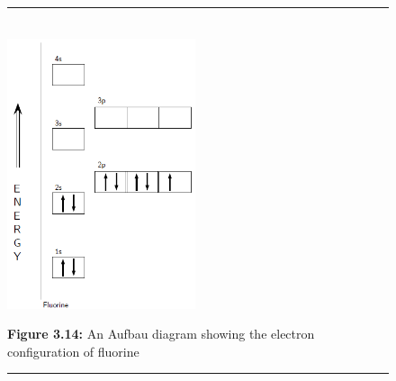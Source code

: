     \setcounter{subfigure}{0}
	\begin{figure}[H] %
    \begin{center}
    \rule[.1in]{\figurerulewidth}{.005in} \\
        \label{m38741*uid102!!!underscore!!!media}\label{m38741*uid102!!!underscore!!!printimage}\includegraphics[height=300px]{col11305.imgs/m38741_CG10C3_010.png} %
      \vspace{2pt}
    \vspace{\rubberspace}\par \begin{cnxcaption}
	  \small \textbf{Figure 3.14: }An Aufbau diagram showing the electron configuration of fluorine
	\end{cnxcaption}
    \vspace{.1in}
    \rule[.1in]{\figurerulewidth}{.005in} \\
    \end{center}
 \end{figure}       
    \setcounter{subfigure}{0}

